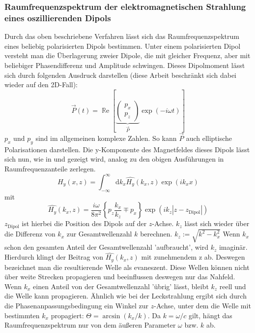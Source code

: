\documentclass[titlepage]{article}
\renewcommand{\Re}{\operatorname{\mathbb{R}e}}
\begin{document}
	\subsubsection{Raumfrequenzspektrum der elektromagnetischen Strahlung eines oszillierenden Dipols}
	\label{sec:spatial_freq_dip}
	Durch das oben beschriebene Verfahren lässt sich das Raumfrequenzspektrum eines beliebig polarisierten Dipols bestimmen. Unter einem polarisierten Dipol versteht man die Überlagerung zweier Dipole, die mit gleicher Frequenz, aber mit beliebiger Phasendifferenz und Amplitude schwingen. Dieses Dipolmoment lässt sich durch folgenden Ausdruck darstellen (diese Arbeit beschränkt sich dabei wieder auf den 2D-Fall): 
	$$\vec{P}(t)= \Re\left[\underbrace{\begin{pmatrix} p_x \\ p_z \end{pmatrix}}_{\vec{P}} \exp(-i\omega t)\right]$$
	$p_x$ und $p_y$ sind im allgemeinen komplexe Zahlen. So kann $\vec{P}$ auch elliptische Polarisationen darstellen. Die y-Komponente des Magnetfeldes dieses Dipols lässt sich nun, wie in \cite{Novotny.2012b} und \cite{RodriguezFortuno.2013} gezeigt wird, analog zu den obigen Ausführungen in Raumfrequenzanteile zerlegen.
	\begin{equation}
		H_y(x, z) = \int_{-\infty}^{\infty}\mathrm{d}k_x\hat{H_y}(k_x, z)\exp(ik _xx) 
	\end{equation}
	mit
	\begin{equation}
		\label{eq:spatial_freq_dip}
		\boxed{\hat{H_y}(k_x, z) = \dfrac{i\omega}{8\pi^2}\left\{p_z\dfrac{k_x}{k_z} \mp p_x\right\}\exp(ik_z|z-z_{\mathrm{Dipol}}|)}
	\end{equation}
	$z_{\mathrm{Dipol}}$ ist hierbei die Position des Dipols auf der $z$-Achse. $k_z$ lässt sich wieder über die Differenz von $k_x$ zur Gesamtwellenzahl $k$ berechnen. $k_z := \sqrt{k^2-k_x^2}$ Wenn $k_x$ schon den gesamten Anteil der Gesamtwellenzahl 'aufbraucht',  wird $k_z$ imaginär. Hierdurch klingt der Beitrag von $\hat{H_y}(k_x, z)$ mit zunehmendem z ab. Deswegen bezeichnet man die resultierende Welle als evaneszent. Diese Wellen können nicht über weite Strecken propagieren und beeinflussen deswegen nur das Nahfeld. Wenn $k_x$ einen Anteil von der Gesamtwellenzahl 'übrig' lässt, bleibt $k_z$ reell und die Welle kann propagieren. Ähnlich wie bei der Leckstrahlung ergibt sich durch die Phasenanpassungsbedingung ein Winkel zur $z$-Achse, unter dem die Welle mit bestimmten $k_x$ propagiert: $\Theta = \arcsin(k_x/k)$. Da $k = \omega / c$ gilt, hängt das Raumfrequenzspektrum nur von dem äußeren Parameter $\omega$ bzw. $k$ ab. 
\end{document}

